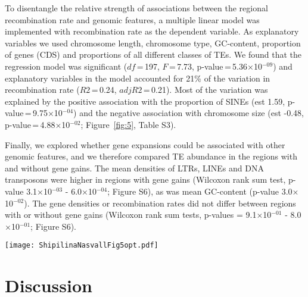 \documentclass[twocolumn]{bmcart}%
\begin{document}
To disentangle the relative strength of associations between the regional recombination rate and genomic features, a multiple linear model was implemented with recombination rate as the dependent variable. As explanatory variables we used chromosome length, chromosome type, GC-content, proportion of genes (CDS) and proportions of all different classes of TEs. We found that the regression model was significant ($df$\,=\,197, $F$\,=\,7.73, p-value\,=\,5.36$\times$10$^{-09}$) and explanatory variables in the model accounted for 21\% of the variation in recombination rate ($R2$\,=\,0.24, $adj R2$\,=\,0.21). Most of the variation was explained by the positive association with the proportion of SINEs (est 1.59, p-value\,=\,9.75$\times$10$^{-04}$) and the negative association with chromosome size (est -0.48, p-value\,=\,4.88$\times$10$^{-02}$; Figure~\ref{fig:5},  Table S3).

Finally, we explored whether gene expansions could be associated with other genomic features, and we therefore compared TE abundance in the regions with and without gene gains. The mean densities of LTRs, LINEs and DNA transposons were higher in regions with gene gains (Wilcoxon rank sum test, p-value 3.1$\times$10$^{-03}$ - 6.0$\times$10$^{-04}$; Figure S6), as was mean GC-content (p-value 3.0$\times$10$^{-02}$). The gene densities or recombination rates did not differ between regions with or without gene gains (Wilcoxon rank sum tests, p-values = 9.1$\times$10$^{-01}$ - 8.0$\times$10$^{-01}$; Figure S6).

\begin{figure*}[tb]
    \centering
\texttt{[image: ShipilinaNasvallFig5opt.pdf]}
    \caption{Correlation between recombination rate and density of genomic features. A) Summary of the linear model with regional recombination rate as the response variable. Each explanatory variable in the model is listed along the Y-axis and the relative estimated effect (X-axis), and error intervals are indicated with horizontal bars for each variable. B - H) Associations between the regional recombination rate and specific genomic features. Linear regression lines, Spearman's correlation coefficients ($\rho$) and the corresponding $\rho$-values for significant analyzes are given. Gray dots/lines indicate autosomal regions and turquoise dots/lines Z-chromosome linked regions
}
    \label{fig:5}
\end{figure*}


\section*{Discussion}
\end{document}
